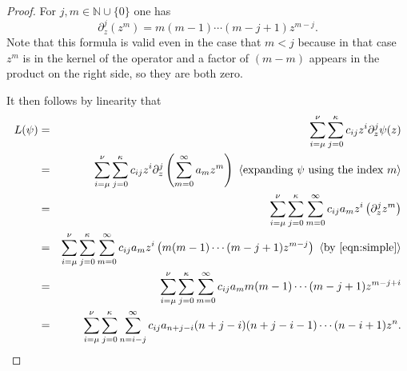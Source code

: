 \documentclass[10pt,a4paper]{amsart}
\def\N{\mathbb{N}}
\def\dmax{\kappa}
\def\hexpl#1{\hbox{ $\langle$\textit{#1}$\rangle$}}
\def\zmax{\nu}
\def\zmin{\mu}
\begin{document}
\begin{proof}
For $j,m\in\N\cup\{0\}$ one has
\begin{equation}\label{eqn:simple}
\partial_z^{j}(z^m)
=
m(m-1)\cdots(m-j+1)z^{m-j}.
\end{equation}
Note that this formula is valid even in the case that $m<j$ because in
that case $z^m$ is in the kernel of the operator and a factor of
$(m-m)$ appears in the product on the right side, so they are both zero.

It then follows by linearity that
\begin{eqnarray*}
  L(\psi)&=&\sum_{i=\zmin}^{\zmax}\sum_{j=0}^{\dmax}c_{ij}z^i\partial_z^j\psi(z)\\
         &=&\sum_{i=\zmin}^{\zmax}\sum_{j=0}^{\dmax}
             c_{ij}z^i\partial_z^j\left( \sum_{m=0}^\infty a_m z^m\right)
  \hexpl{expanding $\psi$ using the index $m$}\\
         &=&\sum_{i=\zmin}^{\zmax}\sum_{j=0}^{\dmax}\sum_{m=0}^\infty c_{ij}a_mz^i\left(\partial_z^jz^m\right)\\
  &=&\sum_{i=\zmin}^{\zmax}\sum_{j=0}^{\dmax}\sum_{m=0}^\infty c_{ij}a_mz^i\left( m(m-1)\cdots(m-j+1)z^{m-j}\right)
\hexpl{by \eqref{eqn:simple}}\\
\phantom{L(\psi)}  &=&\sum_{i=\zmin}^{\zmax}\sum_{j=0}^{\dmax}\sum_{m=0}^\infty c_{ij}a_m
      m(m-1)\cdots(m-j+1)z^{m-j+i}\\
  &=&\sum_{i=\zmin}^{\zmax}\sum_{j=0}^{\dmax}\sum_{n=i-j}^\infty c_{ij}a_{n+j-i}
      (n+j-i)(n+j-i-1)\cdots(n-i+1)z^{n}.
\end{eqnarray*}


\end{proof}
\end{document}
